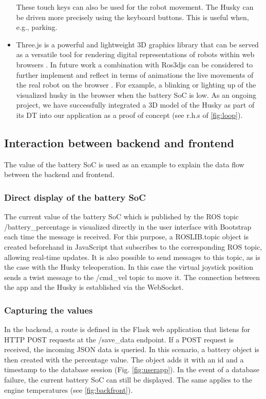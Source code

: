 \documentclass[conference]{IEEEtran}
\begin{document}
\begin{itemize}
These touch keys can also be used for the robot movement. The Husky can be driven more precisely using the keyboard buttons. This is useful when, e.g., parking.
\item Three.js is a powerful and lightweight 3D graphics library that can be served as a versatile tool for rendering digital representations of robots within web browsers \cite{threejs}. In future work a combination with Ros3djs can be considered to further implement and reflect in terms of animations the live movements of the real robot on the browser \cite{ros3djs}. For example, a blinking or lighting up of the visualized husky in the browser when the battery SoC is low. 
As an ongoing project, we have successfully integrated a 3D model  of the Husky as part of its DT into our application as a proof of concept (see r.h.s of \cref{fig:loop}).
\end{itemize}

\subsection{Interaction between backend and frontend}
The value of the battery SoC is used as an example to explain the data flow between the backend and frontend. 
\subsubsection{Direct display of the battery SoC}
The current value of the battery SoC which is published by the ROS topic /battery\_percentage is visualized directly in the user interface with Bootstrap each time the message is received. For this purpose, a ROSLIB.topic object is created beforehand in JavaScript that subscribes to the corresponding ROS topic, allowing real-time updates. It is also possible to send messages to this topic, as is the case with the Husky teleoperation. 
In this case the virtual joystick position sends a twist message to the /cmd\_vel topic to move it. 
The connection between the app and the Husky is established via the WebSocket. 
\subsubsection{Capturing the values}
In the backend, a route is defined in the Flask web application that listens for HTTP POST requests at the /save\_data endpoint. If a POST request is received, the incoming JSON data is queried. In this scenario, a battery object is then created with the percentage value. The object adds it with an id and a timestamp to the database session (Fig. \ref{fig:userapp}). In the event of a database failure, the current battery SoC can still be displayed. The same applies to the engine temperatures (see \cref{fig:backfront}).
\end{document}
